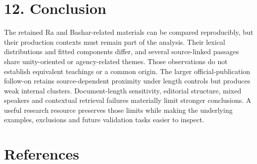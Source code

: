 \documentclass[
  11pt,
]{article}
\begin{document}
\FloatBarrier

\section{12. Conclusion}\label{conclusion}

The retained Ra and Bashar-related materials can be compared
reproducibly, but their production contexts must remain part of the
analysis. Their lexical distributions and fitted components differ, and
several source-linked passages share unity-oriented or agency-related
themes. Those observations do not establish equivalent teachings or a
common origin. The larger official-publication follow-on retains
source-dependent proximity under length controls but produces weak
internal clusters. Document-length sensitivity, editorial structure,
mixed speakers and contextual retrieval failures materially limit
stronger conclusions. A useful research resource preserves those limits
while making the underlying examples, exclusions and future validation
tasks easier to inspect.

\clearpage

\section*{References}\label{references}
\end{document}
